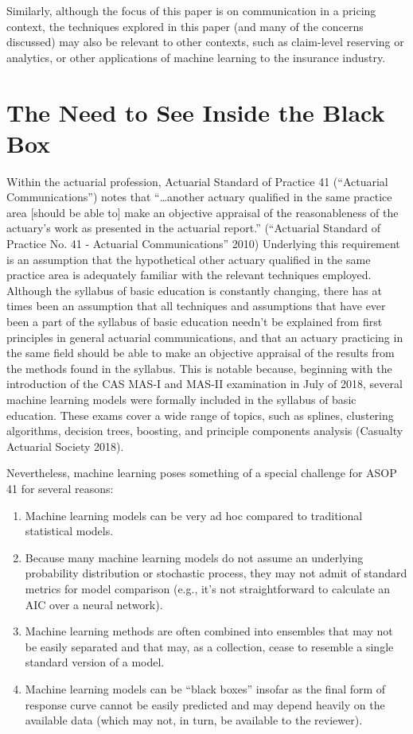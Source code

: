 \documentclass[preprint, 3p, twocolumn, letterpaper, 10pt]{elsarticle} %
\providecommand{\tightlist}{%
  \setlength{\itemsep}{0pt}\setlength{\parskip}{0pt}}
\begin{document}
Similarly, although the focus of this paper is on communication in a pricing
context, the techniques explored in this paper (and many of the concerns discussed)
may also be relevant to other contexts, such as claim-level reserving or analytics,
or other applications of machine learning to the insurance industry.

\hypertarget{need}{%
\section{The Need to See Inside the Black Box}\label{need}}

Within the actuarial profession, Actuarial Standard of Practice 41 (``Actuarial
Communications'') notes that ``\ldots{}another actuary qualified in the same practice
area {[}should be able to{]} make an objective appraisal of the reasonableness of
the actuary's work as presented in the actuarial report.'' (``Actuarial Standard of Practice No. 41 - Actuarial Communications'' 2010) Underlying
this requirement is an assumption that the hypothetical other actuary qualified
in the same practice area is adequately familiar with the relevant techniques
employed. Although the syllabus of basic education is constantly changing, there
has at times been an assumption that all techniques and assumptions that have
ever been a part of the syllabus of basic education needn't be explained from
first principles in general actuarial communications, and that an actuary
practicing in the same field should be able to make an objective appraisal of
the results from the methods found in the syllabus.
This is notable because, beginning with the introduction
of the CAS MAS-I and MAS-II examination in July of 2018, several machine learning
models were formally included in the syllabus of basic education. These exams
cover a wide range of topics, such as splines, clustering algorithms, decision
trees, boosting, and principle components analysis (Casualty Actuarial Society 2018).

Nevertheless, machine learning poses something of a special challenge for ASOP
41 for several reasons:

\begin{enumerate}
\def\labelenumi{\arabic{enumi}.}
\tightlist
\item
  Machine learning models can be very ad hoc compared to
  traditional statistical models.
\item
  Because many machine learning models do not assume an underlying probability
  distribution or stochastic process, they may not admit of standard metrics for model comparison
  (e.g., it's not straightforward to calculate an AIC over a neural network).
\item
  Machine learning methods are often combined into ensembles that
  may not be easily separated and that may, as a collection, cease to resemble
  a single standard version of a model.
\item
  Machine learning models can be ``black boxes'' insofar as the final form of
  response curve cannot be easily predicted and may depend heavily on the
  available data (which may not, in turn, be available to the reviewer).
\end{enumerate}
\end{document}
